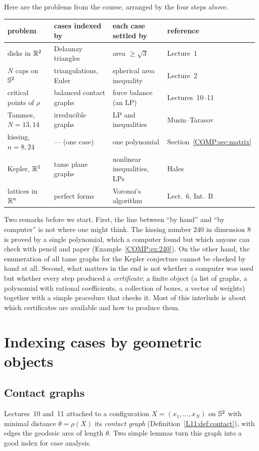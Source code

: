 Here are the problems from the course, arranged by the four steps above.
\begin{center}
\renewcommand{\arraystretch}{1.25}
\small
\begin{tabular}{p{}p{}p{}p{}}
\toprule
problem & cases indexed by & each case settled by & reference\\
\midrule
disks in $\mathbb{R}^2$ & Delaunay triangles & area $\ge\sqrt3$ & Lecture~1\\
$N$ caps on $\mathbb{S}^2$ & triangulations, Euler & spherical area inequality & Lecture~2\\
critical points of $\rho$ & balanced contact graphs & force balance (an LP) & Lectures~10--11\\
Tammes, $N{=}13,14$ & irreducible graphs & LP and inequalities & Musin--Tarasov\\
kissing, $n=8,24$ & --- (one case) & one polynomial & Section~\ref{COMP:sec:matrix}\\
Kepler, $\mathbb{R}^3$ & tame plane graphs & nonlinear inequalities, LPs & Hales\\
lattices in $\mathbb{R}^n$ & perfect forms & Voronoi's algorithm & Lect.~6, Int.~B\\
\bottomrule
\end{tabular}
\end{center}
Two remarks before we start. First, the line between ``by hand'' and ``by computer'' is not where one
might think. The kissing number $240$ in dimension $8$ is proved by a single polynomial, which a
computer found but which anyone can check with pencil and paper (Example~\ref{COMP:ex:240}). On the
other hand, the enumeration of all tame graphs for the Kepler conjecture cannot be checked by hand at
all. Second, what matters in the end is not whether a computer was used but whether every step
produced a \emph{certificate}: a finite object (a list of graphs, a polynomial with rational
coefficients, a collection of boxes, a vector of weights) together with a simple procedure that checks
it. Most of this interlude is about which certificates are available and how to produce them.

\section{Indexing cases by geometric objects}
\label{COMP:sec:index}

\subsection{Contact graphs}
Lectures~10 and~11 attached to a configuration $X=(x_1,\dots,x_N)$ on $\mathbb{S}^2$ with minimal distance
$\theta=\rho(X)$ its \emph{contact graph} (Definition~\ref{L11:def:contact}), with edges the geodesic arcs of
length $\theta$. Two simple lemmas turn this graph into a good index for case analysis.

